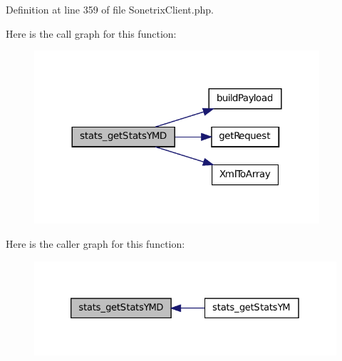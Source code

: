 Definition at line 359 of file SonetrixClient.php.








Here is the call graph for this function:\nopagebreak
\begin{figure}[H]
\begin{center}
\leavevmode
\includegraphics[width=300pt]{classSonetrixClient_a937ec2e1055b8ccfae32ab80f9a4302e_cgraph}
\end{center}
\end{figure}




Here is the caller graph for this function:\nopagebreak
\begin{figure}[H]
\begin{center}
\leavevmode
\includegraphics[width=326pt]{classSonetrixClient_a937ec2e1055b8ccfae32ab80f9a4302e_icgraph}
\end{center}
\end{figure}


